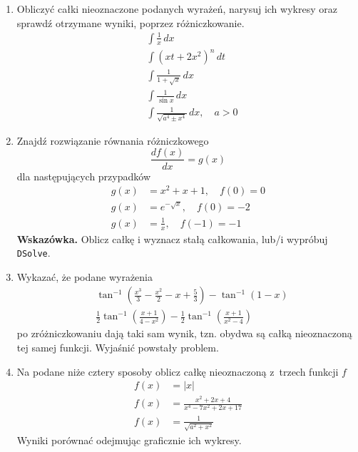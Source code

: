 \documentclass[a4paper,11pt]{article}
\begin{document}
\begin{enumerate}

\item Obliczyć całki nieoznaczone podanych wyrażeń, narysuj ich
  wykresy oraz sprawdź otrzymane wyniki, poprzez różniczkowanie.
  \begin{align}
    &\int \frac{ 1 }{ x } \, dx \\
    &\int ( xt + 2x^{ 2 } )^{ n } \, dt \\
    &\int \frac{ 1 }{ 1 + \sqrt{ x } } \, dx \\
    &\int \frac{ 1 }{ \sin x } \, dx \\
    &\int \frac{ 1 }{ \sqrt{ a^{ 4 } \pm x^{ 4 } } } \, dx, \quad
      a > 0
  \end{align}

\item Znajdź rozwiązanie równania różniczkowego
  \begin{equation}
    \label{eq:6}
    \frac{ d f( x ) }{ dx } = g( x )
  \end{equation}
  dla następujących przypadków
  \begin{align}
    g( x ) &= x^{ 2 } + x + 1, \quad
             f( 0 ) = 0 \\
    g( x ) &= e^{ -\sqrt{ x } }, \quad
             f( 0 ) = -2 \\
    g( x ) &= \frac{ 1 }{ x }, \quad
             f( -1 ) = -1
  \end{align}
  \textbf{Wskazówka.} Oblicz całkę i wyznacz stałą całkowania, lub/i
  wypróbuj \texttt{DSolve}.


\item Wykazać, że podane wyrażenia
  \begin{align}
    &\tan^{ -1 }\left( \frac{ x^{ 3 } }{ 3 } - \frac{ x^{ 2 } }{ 2 }
      - x + \frac{ 5 }{ 3 } \right)
      - \tan^{ -1 }( 1 - x ) \\
    &\frac{ 1 }{ 2 } \tan^{ -1 }\left( \frac{ x + 1 }{ 4 - x^{ 2 } } \right)
      - \frac{ 1 }{ 2 } \tan^{ -1 }\left( \frac{ x + 1 }{ x^{ 2 } - 4 }
      \right)
  \end{align}
  po zróżniczkowaniu dają taki sam wynik, tzn. obydwa są całką
  nieoznaczoną tej samej funkcji. Wyjaśnić powstały problem.

\item Na podane niże cztery sposoby oblicz całkę nieoznaczoną z~trzech
  funkcji $f$
  \begin{align}
    f( x ) &= | x | \\
    f( x ) &= \frac{ x^{ 2 } + 2x + 4 }{ x^{ 4 } - 7 x^{ 2 } + 2x + 17 } \\
    f( x ) &= \frac{ 1 }{ \sqrt{ a^{ 2 } + x^{ 2 } } }
  \end{align}
  Wyniki porównać odejmując graficznie ich wykresy.


\end{enumerate}
\end{document}
